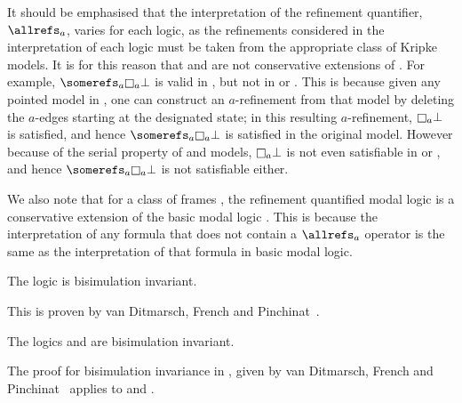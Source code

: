 It should be emphasised that the interpretation of the refinement quantifier,
$\allrefs_a$, varies for each logic, as the refinements considered in the
interpretation of each logic must be taken from the appropriate class of Kripke
models. It is for this reason that \logicSF{} and \logicKDF{} are not
conservative extensions of \logicKF{}. For example, $\somerefs_a \knows_a \bot$
is valid in \logicKF{}, but not in \logicSF{} or \logicKDF{}. This is because
given any pointed model in \classK{}, one can construct an $a$-refinement from
that model by deleting the $a$-edges starting at the designated state; in this
resulting $a$-refinement, $\knows_a \bot$ is satisfied, and hence $\somerefs_a
\knows_a \bot$ is satisfied in the original model. However because of the serial
property of \classS{} and \classKD{} models, $\knows_a \bot$ is not even
satisfiable in \logicSF{} or \logicKDF{}, and hence $\somerefs_a \knows_a \bot$
is not satisfiable either.

We also note that for a class of frames \classC{}, the refinement quantified
modal logic \logicCF{} is a conservative extension of the basic modal logic
\logicC{}. This is because the interpretation of any formula that does not
contain a $\allrefs_a$ operator is the same as the interpretation of that
formula in basic modal logic.

\begin{lemma}
The logic \logicKF{} is bisimulation invariant.
\end{lemma}

This is proven by van Ditmarsch, French and Pinchinat~\cite{french2010future}.

\begin{lemma}
The logics \logicKDF{} and \logicSF{} are bisimulation invariant.
\end{lemma}

The proof for bisimulation invariance in \logicKF{}, given by van Ditmarsch,
French and Pinchinat~\cite{french2010future} applies to \logicSF{} and
\logicKDF{}.

